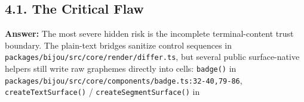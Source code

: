 \subsection{4.1. The Critical Flaw}\label{record-416-the-critical-flaw}

\textbf{Answer:} The most severe hidden risk is the incomplete terminal-content trust boundary. The plain-text bridges sanitize control sequences in \texttt{p\allowbreak{}a\allowbreak{}c\allowbreak{}k\allowbreak{}a\allowbreak{}g\allowbreak{}e\allowbreak{}s\allowbreak{}/\allowbreak{}b\allowbreak{}i\allowbreak{}j\allowbreak{}o\allowbreak{}u\allowbreak{}/\allowbreak{}s\allowbreak{}r\allowbreak{}c\allowbreak{}/\allowbreak{}c\allowbreak{}o\allowbreak{}r\allowbreak{}e\allowbreak{}/\allowbreak{}r\allowbreak{}e\allowbreak{}n\allowbreak{}d\allowbreak{}e\allowbreak{}r\allowbreak{}/\allowbreak{}d\allowbreak{}i\allowbreak{}f\allowbreak{}f\allowbreak{}e\allowbreak{}r\allowbreak{}.\allowbreak{}t\allowbreak{}s}, but several public surface-native helpers still write raw graphemes directly into cells: \texttt{b\allowbreak{}a\allowbreak{}d\allowbreak{}g\allowbreak{}e\allowbreak{}(\allowbreak{})} in \texttt{p\allowbreak{}a\allowbreak{}c\allowbreak{}k\allowbreak{}a\allowbreak{}g\allowbreak{}e\allowbreak{}s\allowbreak{}/\allowbreak{}b\allowbreak{}i\allowbreak{}j\allowbreak{}o\allowbreak{}u\allowbreak{}/\allowbreak{}s\allowbreak{}r\allowbreak{}c\allowbreak{}/\allowbreak{}c\allowbreak{}o\allowbreak{}r\allowbreak{}e\allowbreak{}/\allowbreak{}c\allowbreak{}o\allowbreak{}m\allowbreak{}p\allowbreak{}o\allowbreak{}n\allowbreak{}e\allowbreak{}n\allowbreak{}t\allowbreak{}s\allowbreak{}/\allowbreak{}b\allowbreak{}a\allowbreak{}d\allowbreak{}g\allowbreak{}e\allowbreak{}.\allowbreak{}t\allowbreak{}s\allowbreak{}:\allowbreak{}3\allowbreak{}2\allowbreak{}-\allowbreak{}4\allowbreak{}0\allowbreak{},\allowbreak{}7\allowbreak{}9\allowbreak{}-\allowbreak{}8\allowbreak{}6}, \texttt{c\allowbreak{}r\allowbreak{}e\allowbreak{}a\allowbreak{}t\allowbreak{}e\allowbreak{}T\allowbreak{}e\allowbreak{}x\allowbreak{}t\allowbreak{}S\allowbreak{}u\allowbreak{}r\allowbreak{}f\allowbreak{}a\allowbreak{}c\allowbreak{}e\allowbreak{}(\allowbreak{})} / \texttt{c\allowbreak{}r\allowbreak{}e\allowbreak{}a\allowbreak{}t\allowbreak{}e\allowbreak{}S\allowbreak{}e\allowbreak{}g\allowbreak{}m\allowbreak{}e\allowbreak{}n\allowbreak{}t\allowbreak{}S\allowbreak{}u\allowbreak{}r\allowbreak{}f\allowbreak{}a\allowbreak{}c\allowbreak{}e\allowbreak{}(\allowbreak{})} in 